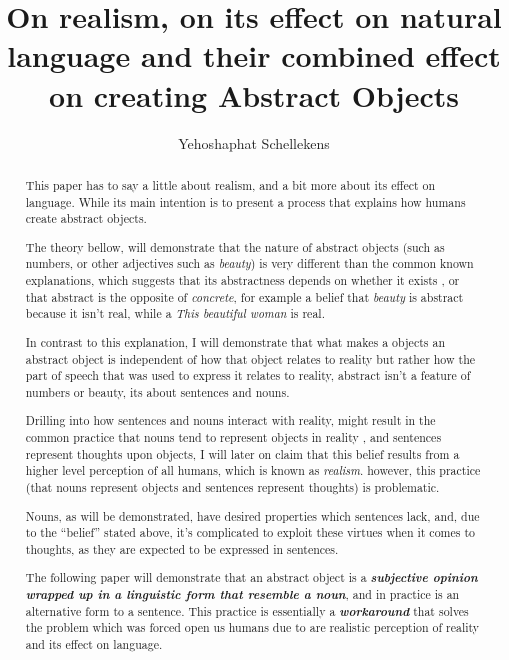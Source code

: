 \documentclass[10pt]{article}
\begin{document}
\title{On realism,
on its effect on natural language
and their combined effect on creating Abstract Objects}
\author{Yehoshaphat Schellekens}
\maketitle

\begin{abstract}
\par
This paper has to say a little about realism, and a bit more about its effect on  language. While its main intention is to present a process that explains how humans create abstract objects. \par
The theory bellow, will demonstrate that  the nature of abstract objects (such as numbers, or other adjectives such as \textit{beauty}) is very different than the common known explanations, which suggests that its abstractness depends on whether it exists , or that abstract is the opposite of \textit{concrete}, for example a belief that \textit{beauty}  is abstract because it isn't real, while a \textit{This beautiful woman} is real. \par
In contrast to this explanation, I will demonstrate that what makes a objects an abstract object is independent of how that object relates to reality but rather how the part of speech that was used to express it relates to reality, abstract isn’t a feature of numbers or  beauty, its about sentences and nouns. \par
Drilling into how sentences and nouns interact with reality, might result in the common practice  that nouns tend to represent objects in reality , and sentences represent  thoughts upon objects, I will later on claim that this belief results from a higher level  perception of all humans, which is known as \textit{realism}. however, this practice (that nouns represent objects and   sentences  represent thoughts) is problematic. \par
Nouns, as will be demonstrated, have desired properties which sentences lack, and, due to the “belief” stated above, it's complicated to exploit these virtues when it comes to thoughts, as they are expected to be expressed in sentences. \par
The following paper will demonstrate that an abstract object is a \textbf{\textit{subjective opinion wrapped up in a linguistic form that resemble a noun}}, and in practice is an alternative form to a sentence. This practice is essentially a \textbf{\textit{workaround}} that solves the problem which was forced open us humans due to are realistic perception of reality and its effect on language.
\end{abstract}
\end{document}
